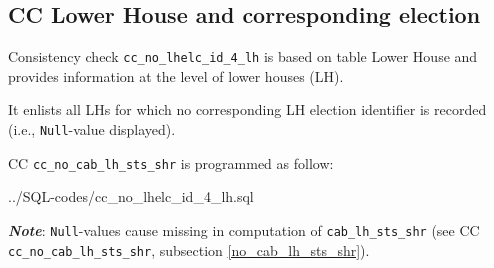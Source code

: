 \subsection{CC Lower House and corresponding election}\label{cc_no_lhelc_id_4_lh}
Consistency check \texttt{\footnotesize cc\_no\_lhelc\_id\_4\_lh} is based on table Lower House and provides information at the level of lower houses (LH). 

It enlists all LHs for which no corresponding LH election identifier is recorded (i.e., \texttt{\footnotesize Null}-value displayed).

CC \texttt{\footnotesize cc\_no\_cab\_lh\_sts\_shr} is programmed as follow: 

%
{../SQL-codes/cc_no_lhelc_id_4_lh.sql}

{\em{\bf Note}}: \texttt{\footnotesize Null}-values cause missing in computation of \texttt{\footnotesize cab\_lh\_sts\_shr} (see CC \texttt{\footnotesize cc\_no\_cab\_lh\_sts\_shr}, subsection \ref{no_cab_lh_sts_shr}).